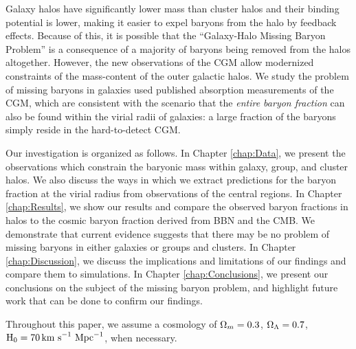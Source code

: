 Galaxy halos have significantly lower mass than cluster halos and
their binding potential is lower, making it easier to expel baryons
from the halo by feedback effects. Because of this, it is possible
that the ``Galaxy-Halo Missing Baryon Problem'' is a consequence of a
majority of baryons being removed from the halos altogether. However,
the new observations of the CGM allow modernized constraints of the
mass-content of the outer galactic halos. We study the problem of
missing baryons in galaxies used published absorption measurements of
the CGM, which are consistent with the scenario that the
\textit{entire baryon fraction} can also be found within the virial
radii of galaxies: a large fraction of the baryons simply reside in
the hard-to-detect CGM.

Our investigation is organized as follows. In Chapter \ref{chap:Data}, we
present the observations which constrain the baryonic mass within
galaxy, group, and cluster halos. We also discuss the ways in which we
extract predictions for the baryon fraction at the virial radius from
observations of the central regions. In Chapter \ref{chap:Results},
we show our results and compare the observed baryon fractions in halos to the cosmic
baryon fraction derived from BBN and the CMB. We demonstrate that current
evidence suggests that there may be no problem of missing baryons in
either galaxies or groups and clusters. In Chapter \ref{chap:Discussion},
we discuss the implications and limitations of our findings and
compare them to simulations. In Chapter \ref{chap:Conclusions}, we
present our conclusions on the subject of the missing baryon problem,
and highlight future work that can be done to confirm our findings. 

Throughout this paper, we assume a cosmology of $\Omega_m = 0.3$,
$\Omega_\Lambda = 0.7$, $\textrm{H\ensuremath{_0}} = 70\,\textrm{km~s}^{-1}~\textrm{Mpc}^{-1}$, when
necessary. 
